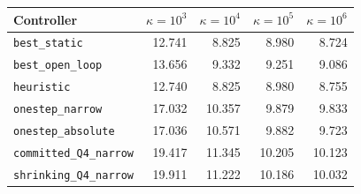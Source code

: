 \begin{tabular}{lrrrr}
\toprule
Controller & $\kappa = 10^{3}$ & $\kappa = 10^{4}$ & $\kappa = 10^{5}$ & $\kappa = 10^{6}$ \\
\midrule
\texttt{best\_static} & 12.741 & 8.825 & 8.980 & 8.724 \\
\texttt{best\_open\_loop} & 13.656 & 9.332 & 9.251 & 9.086 \\
\texttt{heuristic} & 12.740 & 8.825 & 8.980 & 8.755 \\
\texttt{onestep\_narrow} & 17.032 & 10.357 & 9.879 & 9.833 \\
\texttt{onestep\_absolute} & 17.036 & 10.571 & 9.882 & 9.723 \\
\texttt{committed\_Q4\_narrow} & 19.417 & 11.345 & 10.205 & 10.123 \\
\texttt{shrinking\_Q4\_narrow} & 19.911 & 11.222 & 10.186 & 10.032 \\
\bottomrule
\end{tabular}
